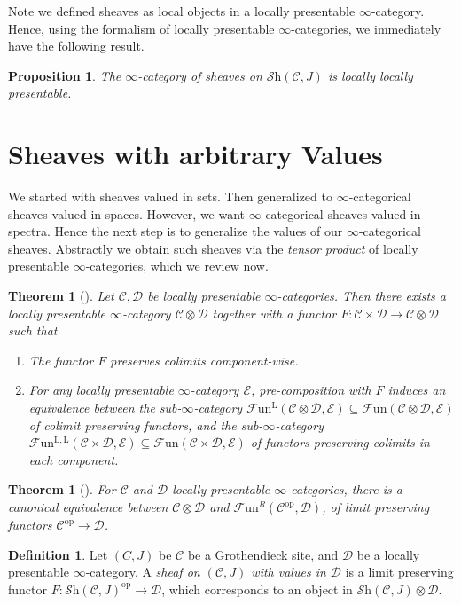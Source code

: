 \documentclass[a4paper]{book}
\newcommand{\lC}{\mathcal{C}}
\newcommand{\lD}{\mathcal{D}}
\newcommand{\lE}{\mathcal{E}}
\newcommand{\lF}{\mathcal{F}}
\newcommand{\mL}{\mathrm{L}}
\newcommand{\lS}{\mathcal{S}}
\newcommand{\op}{\mathrm{op}}
\newcommand{\Fun}{\lF\mathrm{un}} %
\newcommand{\Shv}{\lS\mathrm{h}} %
\newtheorem{theorem}[equation]{Theorem}
\newtheorem{proposition}[equation]{Proposition}
\theoremstyle{definition}
\newtheorem{definition}[equation]{Definition}
\theoremstyle{remark}
\numberwithin{equation}{section}
\begin{document}
	Note we defined sheaves as local objects in a locally presentable $\infty$-category. Hence, using the formalism of locally presentable $\infty$-categories, we immediately have the following result. 
	
	\begin{proposition}
		The $\infty$-category of sheaves on $\Shv(\lC,J)$ is locally locally presentable.
	\end{proposition}
	
\section{Sheaves with arbitrary Values}
We started with sheaves valued in sets. Then generalized to $\infty$-categorical sheaves valued in spaces. However, we want $\infty$-categorical sheaves valued in spectra. Hence the next step is to generalize the values of our $\infty$-categorical sheaves. Abstractly we obtain such sheaves via the \emph{tensor product} of locally presentable $\infty$-categories, which we review now.

\begin{theorem}[{\cite[Proposition 4.8.1.15]{lurie2017ha}}]
  Let $\lC, \lD$ be locally presentable $\infty$-categories. Then there exists a locally presentable $\infty$-category $\lC \otimes \lD$ together with a functor $F:\lC\times\lD\rightarrow\lC\otimes\lD$ such that 
  \begin{enumerate}
	\item The functor $F$ preserves colimits component-wise.
	\item For any locally presentable $\infty$-category $\lE$, pre-composition with $F$ induces an equivalence between the sub-$\infty$-category $\Fun^\mL(\lC \otimes \lD , \lE)\subseteq\Fun(\lC \otimes \lD , \lE)$ of colimit preserving functors, and the sub-$\infty$-category $\Fun^{\mL,\mL}(\lC \times \lD, \lE)\subseteq\Fun(\lC\times\lD,\lE)$ of functors preserving colimits in each component. 
  \end{enumerate}
\end{theorem}
\begin{theorem}[{\cite[Proposition 4.8.1.17]{lurie2017ha}}]For $\lC$ and $\lD$ locally presentable $\infty$-categories, there is a canonical equivalence between $\lC\otimes\lD$ and $\Fun^R(\lC^{\op},\lD)$, of limit preserving functors $\lC^{\op}\to\lD$. 
\end{theorem}
\begin{definition}
  Let $(C,J)$ be $\lC$ be a Grothendieck site, and $\lD$ be a locally presentable $\infty$-category. A \emph{sheaf on $(\lC,J)$ with values in $\lD$} is a limit preserving functor $F\colon \Shv(\lC,J)^{\op} \to \lD$, which corresponds to an object in $\Shv(\lC,J) \otimes \lD$. 
\end{definition}
\end{document}
